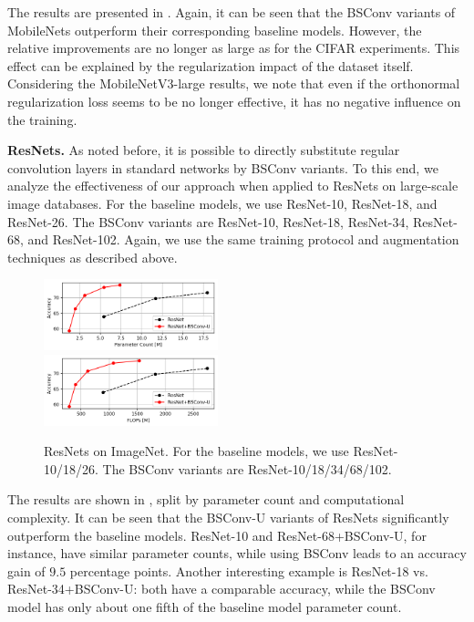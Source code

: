 \documentclass[10pt,twocolumn,letterpaper]{article}
\newcommand{\DCCK}{BSConv\xspace}
\newcommand{\DCCKU}{\DCCK-U\xspace}
\begin{document}
The results are presented in .
Again, it can be seen that the \DCCK variants of MobileNets outperform their corresponding baseline models.
However, the relative improvements are no longer as large as for the \mbox{CIFAR} experiments.
This effect can be explained by the regularization impact of the dataset itself.
Considering the \mbox{MobileNetV3-large} results, we note that even if the orthonormal regularization loss seems to be no longer effective, it has no negative influence on the training.

\textbf{ResNets.}
As noted before, it is possible to directly substitute regular convolution layers in standard networks by \DCCK variants.
To this end, we analyze the effectiveness of our approach when applied to ResNets on large-scale image databases.
For the baseline models, we use ResNet-10, ResNet-18, and ResNet-26.
The \DCCK variants are ResNet-10, ResNet-18, ResNet-34, ResNet-68, and ResNet-102.
Again, we use the same training protocol and augmentation techniques as described above.

\begin{figure}
	\center
	\includegraphics[width=0.45\textwidth]{images/resnets-imagenet-params.png}~~~~~~~~
	\includegraphics[width=0.45\textwidth]{images/resnets-imagenet-flops.png}
	\caption{%
		ResNets on ImageNet.
		For the baseline models, we use ResNet-10/18/26.
		The \DCCK variants are ResNet-10/18/34/68/102.
	}
     \label{fig:resnetsImagenetParamsAndFlops}
\end{figure}

The results are shown in , split by parameter count and computational complexity.
It can be seen that the \DCCKU variants of ResNets significantly outperform the baseline models.
ResNet-10 and \mbox{ResNet-68+\DCCKU}, for instance, have similar parameter counts, while using \DCCK leads to an accuracy gain of $9.5$ percentage points.
Another interesting example is ResNet-18 vs. \mbox{ResNet-34+\DCCKU}: both have a comparable accuracy, while the \DCCK model has only about one fifth of the baseline model parameter count.
\end{document}
